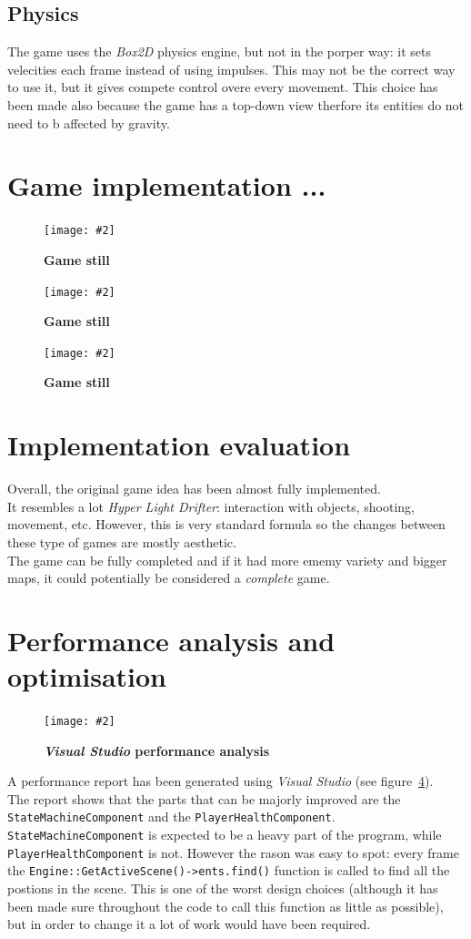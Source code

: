 \documentclass[10pt, a4paper]{article}
\newcommand{\figuremacro}[5]{
    \begin{figure}[#1]
        \centering
        \texttt{[image: \#2]}
        \caption[#3]{\textbf{#3}#4}
        \label{fig:#2}
    \end{figure}
}
\begin{document}
    \subsection{Physics}
    The game uses the \textit{Box2D} physics engine, but not in the porper way: it sets velecities each frame instead of using impulses. This may not be the correct way to use it, but it gives compete control overe every movement. This choice has been made also because the game has a top-down view therfore its entities do not need to b affected by gravity.
    
    \section{Game implementation ...}
    \figuremacro{h}{capture01}{Game still}{}{1.0}
    \figuremacro{h}{capture02}{Game still}{}{1.0}
    \figuremacro{h}{capture03}{Game still}{}{1.0}
    
    
    \section{Implementation evaluation}
    Overall, the original game idea has been almost fully implemented.\\
    It resembles a lot \textit{Hyper Light Drifter}: interaction with objects, shooting, movement, etc. However, this is very standard formula so the changes between these type of games are mostly aesthetic.\\
    The game can be fully completed and if it had more ememy variety and bigger maps, it could potentially be considered a \textit{complete} game.
    
    \section{Performance analysis and optimisation}
    \figuremacro{h}{performance}{\textit{Visual Studio} performance analysis}{}{1.0}
    A performance report has been generated using \textit{Visual Studio} (see figure~\ref{fig:performance}).\\
    The report shows that the parts that can be majorly improved are the \texttt{StateMachineComponent} and the \texttt{PlayerHealthComponent}.\\
    \texttt{StateMachineComponent} is expected to be a heavy part of the program, while \texttt{PlayerHealthComponent} is not. However the rason was easy to spot: every frame the \texttt{Engine::GetActiveScene()->ents.find()} function is called to find all the postions in the scene. This is one of the worst design choices (although it has been made sure throughout the code to call this function as little as possible), but in order to change it a lot of work would have been required.
    
\end{document}
